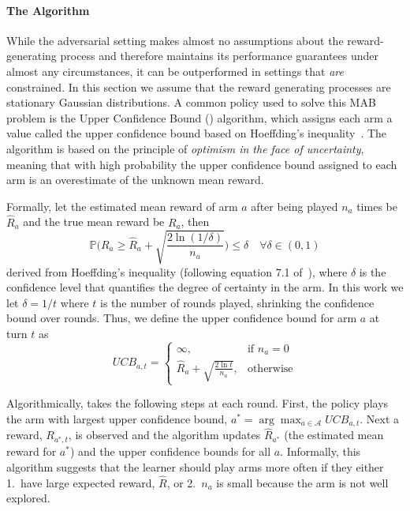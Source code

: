 \paragraph{The \ucb{} Algorithm}
While the adversarial setting makes almost no assumptions about the reward-generating process and therefore maintains its performance guarantees under almost any circumstances, it can be outperformed in settings that \textit{are} constrained. In this section we assume that the reward generating processes are stationary Gaussian distributions.
A common policy used to solve this MAB problem is the Upper Confidence Bound (\ucb{}) algorithm, which assigns each arm a value called the upper confidence bound based on Hoeffding's inequality~\citep{auer2002finite}. The \ucb{} algorithm is based on the principle of \textit{optimism in the face of uncertainty}, meaning that with high probability the upper confidence bound assigned to each arm is an overestimate of the unknown mean reward.

Formally, let the estimated mean reward of arm $a$ after being played $n_{a}$ times be $\hat{R}_{a}$ and the true mean reward be $R_{a}$, then
\[
\mathbb{P}\bigg(R_{a} \ge \hat{R}_{a} + \sqrt{\frac{2\ln (1/\delta)}{n_{a}}}\bigg) \le\delta \quad\forall \delta\in (0,1)
\]
derived from Hoeffding's inequality (following equation 7.1 of~\citet{lattimore_szepesvári_2020}), where $\delta$ is the confidence level that quantifies the degree of certainty in the arm. In this work we let $\delta = 1/t$ where $t$ is the number of rounds played, shrinking the confidence bound over rounds. Thus, we define the upper confidence bound for arm $a$ at turn $t$ as
\begin{equation}
\label{eq:ucb}
UCB_{a,t} = 
\begin{cases}
\infty,& \text{if } n_{a}=0 \\
\hat{R}_{a}+\sqrt{\frac{2\ln t}{n_{a}}},& \text{otherwise}
\end{cases}
\end{equation}

Algorithmically, \ucb{} takes the following steps at each round. First, the \ucb{} policy plays the arm with largest upper confidence bound, $a^{*}=\arg\max_{a\in\mathcal{A}}UCB_{a,t}$. Next a reward, $R_{a^{*},t}$, is observed and the algorithm updates $\hat{R}_{a^{*}}$ (the estimated mean reward for $a^{*}$) and the upper confidence bounds for all $a$. Informally, this algorithm suggests that the learner should play arms more often if they either 1.\ have large expected reward, $\hat{R}$, or 2.\ $n_{a}$ is small because the arm is not well explored.

